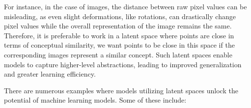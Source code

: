 
For instance, in the case of images, the distance between raw pixel values can be misleading, as even slight deformations, like rotations, can drastically change pixel values while the overall representation of the image remains the same. Therefore, it is preferable to work in a latent space where points are close in terms of conceptual similarity, \ie we want points to be close in this space if the corresponding images represent a similar concept. Such latent spaces enable models to capture higher-level abstractions, leading to improved generalization and greater learning efficiency.

There are numerous examples where models utilizing latent spaces unlock the potential of machine learning models. Some of these include:

